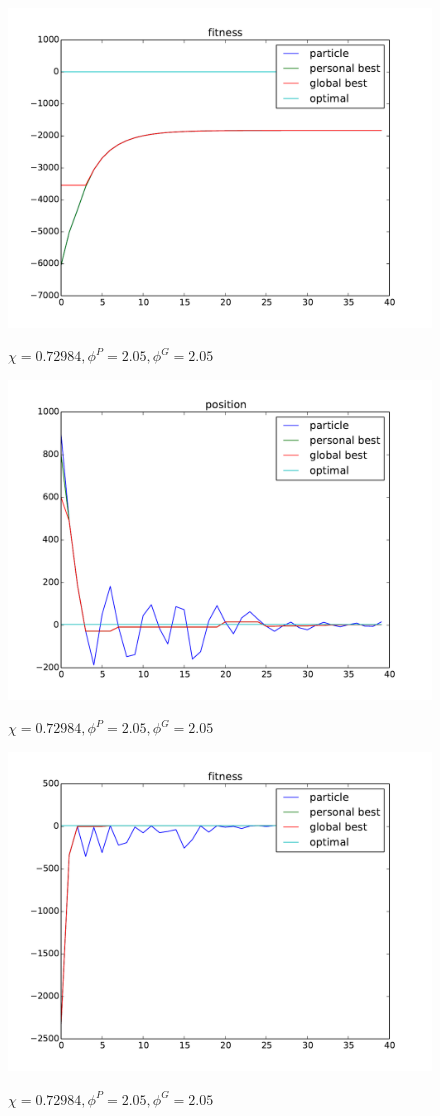 \begin{figure}[ht]
\centering
\includegraphics[width=.7\linewidth]{./simfig/case1/fitness1-1} 
\label{fig:case1-1:fitness}
\caption{$ \chi = 0.72984 , \phi^{P} = 2.05 , \phi^{G} = 2.05 $ }
\end{figure}

\begin{figure}[ht]
\centering
\includegraphics[width=.7\linewidth]{./simfig/case1/position1-2} 
\label{fig:case1-2:position}
\caption{$ \chi = 0.72984 , \phi^{P} = 2.05 , \phi^{G} = 2.05 $ }
\end{figure}
  
\begin{figure}[ht]
\centering
\includegraphics[width=.7\linewidth]{./simfig/case1/fitness1-2} 
\label{fig:case1-2:fitness} 
\caption{$ \chi = 0.72984 , \phi^{P} = 2.05 , \phi^{G} = 2.05 $ }
\end{figure}


